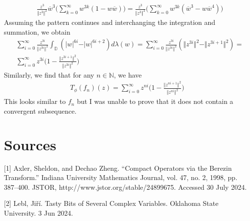 \documentclass[12pt]{article}
\begin{document}
\begin{align*}
&\frac{z^3}{\Vert z^3 \Vert^2} \overline{w}^3 \Bigg(\sum_{k=0}^\infty w^{3k}(1 - w\overline{w})\Bigg) = \frac{z^3}{\Vert z^3 \Vert^2}\Bigg(\sum_{k=0}^\infty w^{3k}(\overline{w}^3 - w\overline{w}^4)\Bigg)
\end{align*} Assuming the pattern continues and interchanging the integration and summation, we obtain
\begin{align*}
& \sum_{i=0}^\infty \frac{z^{3i}}{\Vert z^{3i}\Vert^2} \int_\mathbb{D} (\vert w \vert^{6i} - \vert w \vert^{6i+2}) d\lambda(w)  = \sum_{i=0}^\infty \frac{z^{3i}}{\Vert z^{3i} \Vert^2}(\Vert z^{3i} \Vert^2 - \Vert z^{3i+1}\Vert^2) = \\
& \sum_{i=0}^\infty z^{3i}\bigg(1 - \frac{\Vert z^{3i+1}\Vert^2}{\Vert z^{3i}\Vert^2}\bigg)
\end{align*} Similarly, we find that for any $n \in \mathbb{N}$, we have
\begin{align*}
T_\phi(f_n)(z) = \sum_{i=0}^\infty z^{ni} \bigg(1 - \frac{\Vert z^{ni+1}\Vert^2}{\Vert z^{ni}\Vert^2}\bigg) 
\end{align*} This looks similar to $f_n$ but I was unable to prove that it does not contain a convergent subsequence.
\newpage
\section*{Sources}
\tiny{[1] Axler, Sheldon, and Dechao Zheng. “Compact Operators via the Berezin Transform.” Indiana University Mathematics Journal, vol. 47, no. 2, 1998, pp. 387–400. JSTOR, http://www.jstor.org/stable/24899675. Accessed 30 July 2024.}

\noindent \tiny{[2] Lebl, Jiří. Tasty Bits of Several Complex Variables. Oklahoma State University. 3 Jun 2024.}
\end{document}
